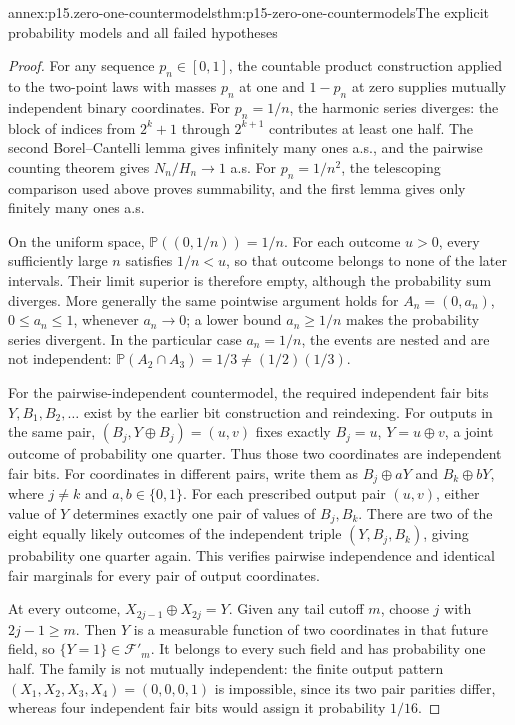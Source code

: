 \begin{annexitem}{annex:p15.zero-one-countermodels}{thm:p15-zero-one-countermodels}{The explicit probability models and all failed hypotheses}
\begin{proof}
For any sequence \(p_n\in[0,1]\), the countable product
construction applied to the two-point laws with masses
\(p_n\) at one and \(1-p_n\) at zero supplies mutually
independent binary coordinates. For \(p_n=1/n\), the
harmonic series diverges: the block of indices from
\(2^k+1\) through \(2^{k+1}\) contributes at least one half.
The second Borel--Cantelli lemma gives infinitely many ones a.s.,
and the pairwise counting theorem gives \(N_n/H_n\to1\)
a.s. For \(p_n=1/n^2\), the telescoping comparison used
above proves summability, and the first lemma gives only
finitely many ones a.s.

On the uniform space, \(\mathbb P((0,1/n))=1/n\).
For each outcome \(u>0\), every sufficiently large \(n\)
satisfies \(1/n<u\), so that outcome belongs to none of
the later intervals. Their limit superior is therefore empty,
although the probability sum diverges. More generally the
same pointwise argument holds for \(A_n=(0,a_n)\),
\(0\leq a_n\leq1\), whenever \(a_n\to0\); a lower
bound \(a_n\geq1/n\) makes the probability series divergent.
In the particular case \(a_n=1/n\), the events are nested and are not independent:
\(\mathbb P(A_2\cap A_3)=1/3\ne(1/2)(1/3)\).

For the pairwise-independent countermodel, the required independent
fair bits \(Y,B_1,B_2,\ldots\) exist by the earlier bit
construction and reindexing. For outputs in the same pair,
\((B_j,Y\oplus B_j)=(u,v)\) fixes exactly
\(B_j=u\), \(Y=u\oplus v\), a joint outcome of probability
one quarter. Thus those two coordinates are independent fair bits.
For coordinates in different pairs, write them as
\(B_j\oplus aY\) and \(B_k\oplus bY\), where
\(j\ne k\) and \(a,b\in\{0,1\}\). For each prescribed
output pair \((u,v)\), either value of \(Y\) determines
exactly one pair of values of \(B_j,B_k\). There are two
of the eight equally likely outcomes of the independent triple
\((Y,B_j,B_k)\), giving probability one quarter again.
This verifies pairwise independence and identical fair marginals
for every pair of output coordinates.

At every outcome, \(X_{2j-1}\oplus X_{2j}=Y\). Given any
tail cutoff \(m\), choose \(j\) with \(2j-1\geq m\).
Then \(Y\) is a measurable function of two coordinates
in that future field, so \(\{Y=1\}\in\mathcal F'_m\).
It belongs to every such field and has probability one half.
The family is not mutually independent: the finite output
pattern \((X_1,X_2,X_3,X_4)=(0,0,0,1)\) is impossible,
since its two pair parities differ, whereas four independent
fair bits would assign it probability \(1/16\).


\end{proof}
\end{annexitem}
